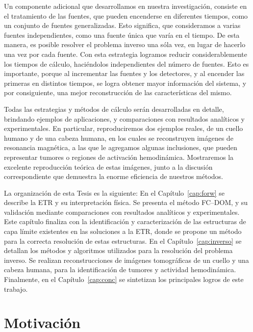 Un componente adicional que desarrollamos en nuestra investigación, 
consiste en el tratamiento de las fuentes, que pueden encenderse 
en diferentes tiempos, como un conjunto de fuentes generalizadas. 
Esto significa, que consideramos a varias fuentes independientes, 
como una fuente única que varía en el tiempo. 
De esta manera, es posible resolver el problema 
inverso una sóla vez, en lugar de hacerlo una vez por cada fuente. 
Con esta estrategia logramos reducir considerablemente los tiempos de 
cálculo, haciéndolos independientes del número de fuentes. 
Esto es importante, porque al incrementar las fuentes y los 
detectores, y al encender las primeras en distintos tiempos, 
se logra obtener mayor información del sistema, y por consiguiente, 
una mejor reconstrucción de las características del mismo.

Todas las estrategias y métodos de cálculo serán desarrolladas 
en detalle, brindando ejemplos de aplicaciones, y comparaciones 
con resultados analíticos y experimentales. 
En particular, reproduciremos dos ejemplos reales, de un cuello 
humano y de una cabeza humana, en los 
cuales se reconstruyen imágenes de resonancia magnética, a las 
que le agregamos algunas inclusiones, que pueden representar 
tumores o regiones de activación hemodinámica.
Mostraremos la excelente reproducción teórica de estas imágenes, 
junto a la discusión correspondiente que demuestra la enorme 
eficiencia de nuestros métodos.

La organización de esta Tesis es la siguiente: 
En el Capítulo~\ref{cap:forw} se describe la ETR y su interpretación 
física. Se presenta el método FC--DOM, y su validación mediante 
comparaciones con resultados analíticos y experimentales. 
Este capítulo finaliza con la identificación y 
caracterización de las estructuras de capa límite existentes 
en las soluciones a la ETR, donde se propone un método para 
la correcta resolución de estas estructuras. 
 En el Capítulo~\ref{cap:inverso}  se detallan los métodos 
y algoritmos utilizados para la resolución del problema inverso. 
Se realizan reconstrucciones de imágenes tomográficas de un cuello 
y una cabeza humana, para la identificación de tumores y actividad hemodinámica. 
Finalmente, en el Capítulo~\ref{cap:conc} se sintetizan los principales 
logros de este trabajo.


\bigskip
\section{Motivación}

